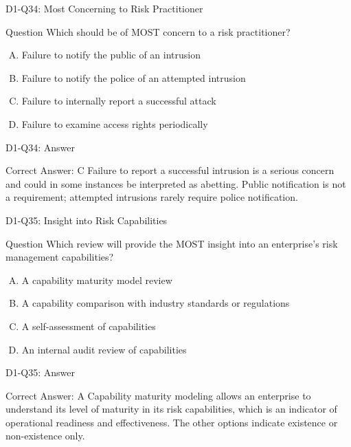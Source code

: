 \documentclass{beamer}
\begin{document}
	\begin{frame}{D1-Q34: Most Concerning to Risk Practitioner}
		\begin{block}{Question}
			Which should be of MOST concern to a risk practitioner?
		\end{block}
		\begin{enumerate}[(A)]
			\item Failure to notify the public of an intrusion
			\item Failure to notify the police of an attempted intrusion
			\item Failure to internally report a successful attack
			\item Failure to examine access rights periodically
		\end{enumerate}
	\end{frame}
	\begin{frame}{D1-Q34: Answer}
		\begin{block}{Correct Answer: C}
			Failure to report a successful intrusion is a serious concern and could in some instances be interpreted as abetting. Public notification is not a requirement; attempted intrusions rarely require police notification.
		\end{block}
	\end{frame}
	
	\begin{frame}{D1-Q35: Insight into Risk Capabilities}
		\begin{block}{Question}
			Which review will provide the MOST insight into an enterprise's risk management capabilities?
		\end{block}
		\begin{enumerate}[(A)]
			\item A capability maturity model review
			\item A capability comparison with industry standards or regulations
			\item A self-assessment of capabilities
			\item An internal audit review of capabilities
		\end{enumerate}
	\end{frame}
	\begin{frame}{D1-Q35: Answer}
		\begin{block}{Correct Answer: A}
			Capability maturity modeling allows an enterprise to understand its level of maturity in its risk capabilities, which is an indicator of operational readiness and effectiveness. The other options indicate existence or non-existence only.
		\end{block}
	\end{frame}
	
\end{document}
